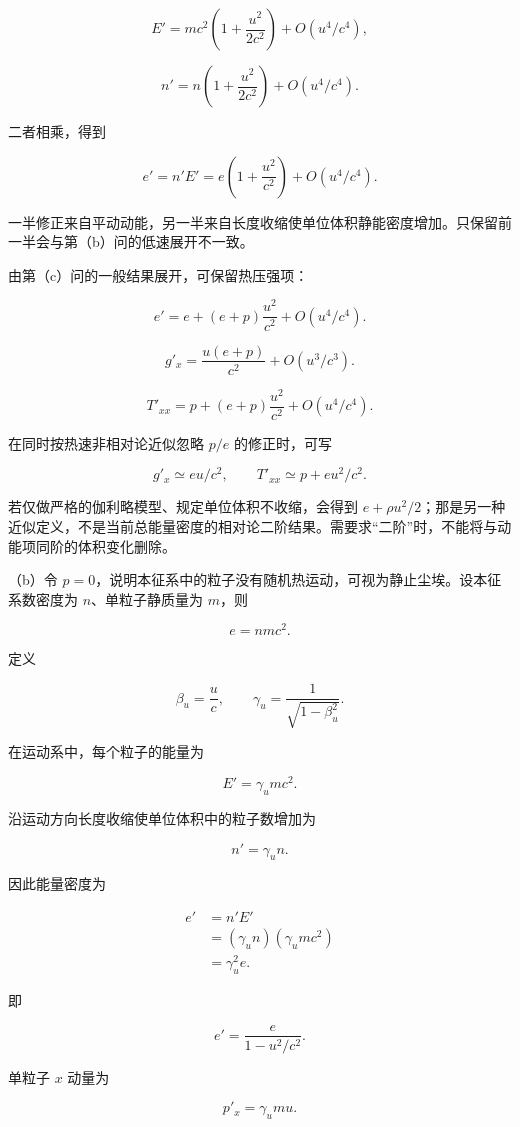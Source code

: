 \documentclass[12pt,a4paper,UTF8]{ctexart}
\begin{document}
\[E'=mc^2\left(1+\frac{u^2}{2c^2}\right)+O(u^4/c^4),\tag{1}\]

\[n'=n\left(1+\frac{u^2}{2c^2}\right)+O(u^4/c^4).\tag{2}\]

二者相乘，得到

\[e'=n'E'=e\left(1+\frac{u^2}{c^2}\right)+O(u^4/c^4).\tag{3}\]

一半修正来自平动动能，另一半来自长度收缩使单位体积静能密度增加。只保留前一半会与第（b）问的低速展开不一致。

由第（c）问的一般结果展开，可保留热压强项：

\[\boxed{e'=e+(e+p)\frac{u^2}{c^2}+O(u^4/c^4)}.\tag{4}\]

\[\boxed{g'_x=\frac{u(e+p)}{c^2}+O(u^3/c^3)}.\tag{5}\]

\[\boxed{T'_{xx}=p+(e+p)\frac{u^2}{c^2}+O(u^4/c^4)}.\tag{6}\]

在同时按热速非相对论近似忽略 \(p/e\) 的修正时，可写

\[g'_x\simeq eu/c^2,\qquad T'_{xx}\simeq p+eu^2/c^2.\tag{7}\]

若仅做严格的伽利略模型、规定单位体积不收缩，会得到
\(e+\rho u^2/2\)；那是另一种近似定义，不是当前总能量密度的相对论二阶结果。需要求``二阶''时，不能将与动能项同阶的体积变化删除。

（b）令
\(p=0\)，说明本征系中的粒子没有随机热运动，可视为静止尘埃。设本征系数密度为
\(n\)、单粒子静质量为 \(m\)，则

\[
e=nmc^2. \tag{9}
\]

定义

\[
\beta_u=\frac uc,
\qquad
\gamma_u=\frac1{\sqrt{1-\beta_u^2}}. \tag{10}
\]

在运动系中，每个粒子的能量为

\[
E'=\gamma_umc^2. \tag{11}
\]

沿运动方向长度收缩使单位体积中的粒子数增加为

\[
n'=\gamma_un. \tag{12}
\]

因此能量密度为

\[
\begin{aligned}
e'
&=n'E'\\
&=(\gamma_un)(\gamma_umc^2)\\
&=\gamma_u^2e.
\end{aligned} \tag{13}
\]

即

\[
\boxed{
e'=\frac{e}{1-u^2/c^2}
}. \tag{14}
\]

单粒子 \(x\) 动量为

\[
p'_x=\gamma_umu. \tag{15}
\]
\end{document}
